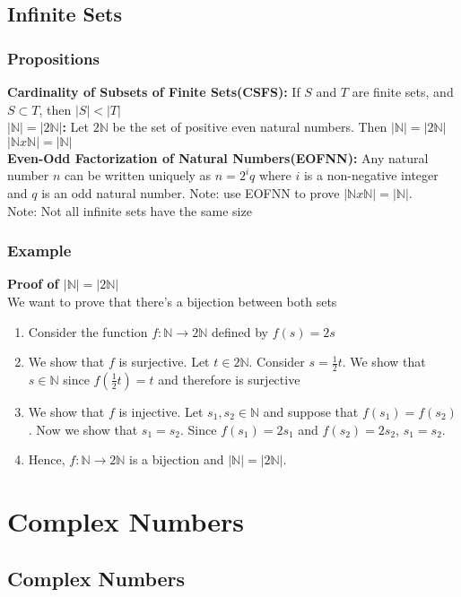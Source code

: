 \documentclass[12pt]{report}
\begin{document}
	\section{Infinite Sets}
		\subsection{Propositions}
			\textbf{Cardinality of Subsets of Finite Sets(CSFS):} If $S$ and $T$ are finite sets, and $S \subset T$, then $|S| < |T|$ \\
			\textbf{$|\mathbb{N}| = |2\mathbb{N}|$:} Let $2\mathbb{N}$ be the set of positive even natural numbers. Then $|\mathbb{N}| = |2\mathbb{N}|$\\
			\textbf{$|\mathbb{N} x \mathbb{N}| = |\mathbb{N}|$}\\
			\textbf{Even-Odd Factorization of Natural Numbers(EOFNN):} Any natural number $n$ can be written uniquely as $n = 2^iq$ where $i$ is a non-negative integer and $q$ is an odd natural number.
			Note: use EOFNN to prove $|\mathbb{N} x \mathbb{N}| = |\mathbb{N}|$.\\
			Note: Not all infinite sets have the same size
		\subsection{Example}
			\textbf{Proof of $|\mathbb{N}| = |2\mathbb{N}|$}\\
			We want to prove that there's a bijection between both sets
			\begin{enumerate}
				\item Consider the function $f:\mathbb{N} \rightarrow 2\mathbb{N}$ defined by $f(s) = 2s$
				\item We show that $f$ is surjective. Let $t \in 2\mathbb{N}$. Consider $s = \frac{1}{2}t$. We show that $s \in \mathbb{N}$ since $f(\frac{1}{2}t) = t$ and therefore is surjective
				\item We show that $f$ is injective. Let $s_1, s_2 \in \mathbb{N}$ and suppose that $f(s_1) = f(s_2)$. Now we show that $s_1 = s_2$. Since $f(s_1) = 2s_1$ and $f(s_2) = 2s_2$, $s_1 = s_2$. 
				\item Hence, $f:\mathbb{N} \rightarrow 2\mathbb{N}$ is a bijection and $|\mathbb{N}| = |2\mathbb{N}|$.
			\end{enumerate}
\chapter{Complex Numbers}
	\section{Complex Numbers}
\end{document}

